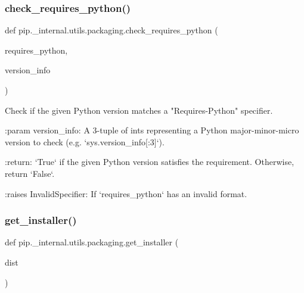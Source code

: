 \subsubsection{\texorpdfstring{check\+\_\+requires\+\_\+python()}{check\_requires\_python()}}
{\footnotesize\ttfamily def pip.\+\_\+internal.\+utils.\+packaging.\+check\+\_\+requires\+\_\+python (\begin{DoxyParamCaption}\item[{}]{requires\+\_\+python,  }\item[{}]{version\+\_\+info }\end{DoxyParamCaption})}

\begin{DoxyVerb}Check if the given Python version matches a "Requires-Python" specifier.

:param version_info: A 3-tuple of ints representing a Python
    major-minor-micro version to check (e.g. `sys.version_info[:3]`).

:return: `True` if the given Python version satisfies the requirement.
    Otherwise, return `False`.

:raises InvalidSpecifier: If `requires_python` has an invalid format.
\end{DoxyVerb}
 \mbox{\label{namespacepip_1_1__internal_1_1utils_1_1packaging_a3017a27d4117f36c01dde2362bcd3316}} 
\subsubsection{\texorpdfstring{get\+\_\+installer()}{get\_installer()}}
{\footnotesize\ttfamily def pip.\+\_\+internal.\+utils.\+packaging.\+get\+\_\+installer (\begin{DoxyParamCaption}\item[{}]{dist }\end{DoxyParamCaption})}

\mbox{\label{namespacepip_1_1__internal_1_1utils_1_1packaging_a754fee3ac3294fe313b4870d848c2e8b}} 
